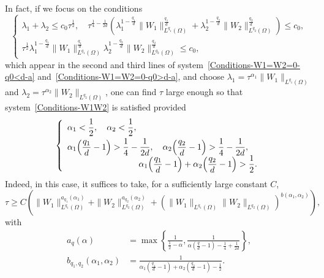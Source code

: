 \documentclass[AHL,Unicode,longabstracts]{cedram}
\newcommand*\ds{\displaystyle}
\renewcommand{\leq}{\leqslant}
\renewcommand{\geq}{\geqslant}
\begin{document}
\begin{rema}
In fact, if we focus on the conditions
\begin{equation}\label{Conditions-W1W2}
\left\{
\begin{array}{l}
\ds
\lambda_1 + \lambda_2 \leq c_0 \tau^{\frac{1}{2}}, \quad
\tau^{\frac{1}{4}-\frac{1}{2d}} \left(\lambda_1^{1- \frac{q_1}{d}} \| W_{1} \|_{L^{q_1}(\Omega)}^{ \frac{q_1}{d}} + \lambda_2^{1- \frac{q_2}{d}} \| W_{2} \|_{L^{q_2}(\Omega)}^{ \frac{q_2}{d}}\right) \leq c_0,
\\[0.15em]
\ds \tau^{\frac{1}{2}} \lambda_1^{1- \frac{q_1}{d}} \| W_{1} \|_{L^{q_1}(\Omega)}^{ \frac{q_1}{d}} \lambda_2^{1- \frac{q_2}{d}} \| W_{2} \|_{L^{q_2}(\Omega)}^{ \frac{q_2}{d}} \leq c_0,
\end{array}\right.
\end{equation}
which appear in the second and third lines of system~\eqref{Conditions-W1=W2=0-q0<d-a} and~\eqref{Conditions-W1=W2=0-q0>d-a}, and choose $\lambda_1 = \tau^{\alpha_1} \| W_1 \|_{L^{q_1}(\Omega)}$ and $\lambda_2 = \tau^{\alpha_2} \| W_2 \|_{L^{q_2}(\Omega)}$, one can find $\tau$ large enough so that system~\eqref{Conditions-W1W2} is satisfied provided
\begin{equation}\label{Conditions-alpha-1-2}
\left\{
\begin{array}{l}
\ds  \alpha_1 < \frac{1}{2},
\quad
\alpha_2 < \frac{1}{2},
\smallskip
\\
\ds  \alpha_1\! \left(\frac{q_1}{d}-1 \right)  > \frac{1}{4} - \frac{1}{2d},
\quad \alpha_2\! \left(\frac{q_2}{d}-1 \right)  >  \frac{1}{4} - \frac{1}{2d},
\\[0.25em]
\mkern150mu
\ds\alpha_1 \!\left(\frac{q_1}{d}-1 \right) + \alpha_2\! \left(\frac{q_2}{d}-1 \right)  >  \frac{1}{2}.
\end{array}\right.
\end{equation}
Indeed, in this case, it suffices to take, for a sufficiently large constant $C$,
\begin{equation}\label{Choice-tau}
\tau \geq C
\left(
\|W_1\|_{L^{q_1}(\Omega)}^{a_{q_1}(\alpha_1)} +
\|W_2\|_{L^{q_2}(\Omega)}^{a_{q_2} (\alpha_2)} +
\left(\|W_1\|_{L^{q_1}(\Omega)} \|W_2\|_{L^{q_2}(\Omega)}\right)^{b(\alpha_1, \alpha_2)}
\right),
\end{equation}
with
\begin{align*}
a_q(\alpha) &= \max\left\{\frac{1}{\ds \frac{1}{2} - \alpha}, \frac{1}{\ds \alpha \left(\frac{q}{d} -1 \right)- \frac{1}{4} + \frac{1}{2d} } \right\},
\\
b_{q_1, q_2} (\alpha_1, \alpha_2) &= \frac{1}{\ds \alpha_1 \left(\frac{q_1}{d} -1 \right)+ \alpha_2 \left(\frac{q_2}{d} -1 \right)- \frac{1}{2}}.

\end{align*}
\end{rema}
\end{document}
